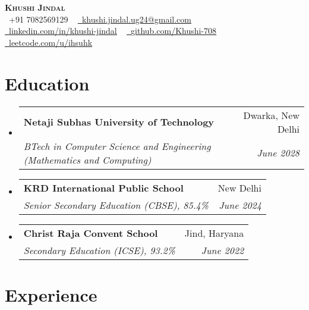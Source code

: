 \documentclass[letterpaper,11pt]{article}
\makeatletter
\newcommand{\resumeItem}[1]{
  \item\small{
    {#1 \vspace{-2pt}}
  }
}
\newcommand{\resumeSubheading}[4]{
  \vspace{-2pt}\item
    \begin{tabular*}{0.97\textwidth}[t]{l@{\extracolsep{\fill}}r}
      \textbf{#1} & #2 \\
      \textit{\small#3} & \textit{\small #4} \\
    \end{tabular*}\vspace{-7pt}
}
\newcommand{\resumeSubHeadingListStart}{\begin{itemize}[leftmargin=0.15in, label={}]}
\newcommand{\resumeItemListStart}{\begin{itemize}}
\newcommand{\resumeItemListEnd}{\end{itemize}\vspace{-5pt}}
\makeatother
\begin{document}


\begin{center}
  {\textbf{\Huge \scshape Khushi Jindal}} \\ \vspace{5pt}
  \small 
  \raisebox{-0.1\height}\faPhone\ +91 7082569129 ~
  \href{mailto:khushi.jindal.ug24@gmail.com}{\raisebox{-0.2\height}\faEnvelope\  \underline{khushi.jindal.ug24@gmail.com}}  \\ \vspace{3pt} %
  \href{https://www.linkedin.com/in/khushi-jindal}{\raisebox{-0.2\height}\faLinkedin\ \underline{linkedin.com/in/khushi-jindal}} ~
  \href{https://github.com/Khushi-708}{\raisebox{-0.2\height}\faGithub\ \underline{github.com/Khushi-708}} ~
  \href{https://leetcode.com/u/ihsuhk/}{\raisebox{-0.2\height}\faCode\ \underline{leetcode.com/u/ihsuhk}}
  \vspace{-8pt}
\end{center}

\section{Education}
  \resumeSubHeadingListStart
    \resumeSubheading
      {Netaji Subhas University of Technology}{Dwarka, New Delhi}
      {BTech in Computer Science and Engineering (Mathematics and Computing)}{June 2028}
    \resumeSubheading
      {KRD International Public School}{New Delhi}
      {Senior Secondary Education (CBSE), 85.4\%}{June 2024}
    \resumeSubheading
      {Christ Raja Convent School}{Jind, Haryana}
      {Secondary Education (ICSE), 93.2\%}{June 2022}
     
      \resumeItemListEnd




 \section{Experience}
%
\end{document}
